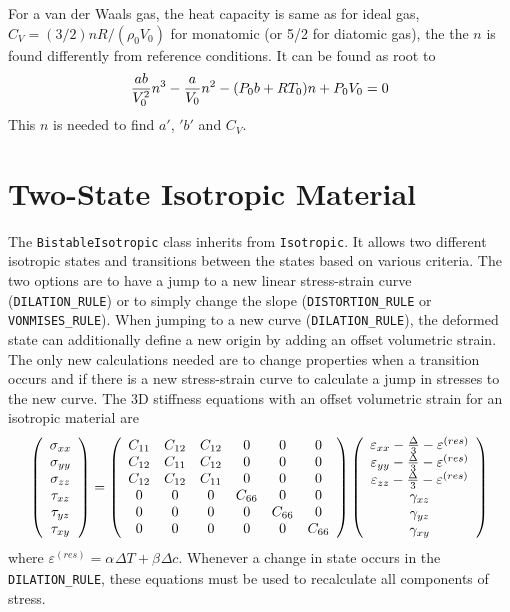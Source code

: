 \documentclass[11pt]{article}
\def\a#1{\alpha_{#1}}
\def\b#1{\beta_{#1}}
\def\code#1{{\small\tt #1}}
\def\DT{\Delta T}
\def\e#1{\varepsilon_{#1}}
\def\er#1{\varepsilon_{#1}^{(res)}}
\def\g#1{\gamma_{#1}}
\def\s#1{\sigma_{#1}}
\def\t#1{\tau_{#1}}
\begin{document}
For a van der Waals gas, the heat capacity is same as for ideal gas, $C_V=(3/2)nR/(\rho_0 V_0)$ for monatomic (or 5/2 for diatomic gas), the the $n$ is found differently from reference conditions. It can be found as root to
\begin{equation}
     {ab\over V_0^2} n^3 - {a\over V_0} n^2 - (P_0b+RT_0)n + P_0V_0 = 0
\end{equation}
This $n$ is needed to find $a'$, $'b'$ and $C_V$.


\section{Two-State Isotropic Material}

The \code{BistableIsotropic} class inherits from \code{Isotropic}. It allows two different isotropic states and transitions  between the states based on various criteria. The two options are to have a jump to a new linear stress-strain curve (\code{DILATION\_RULE}) or to simply change the slope (\code{DISTORTION\_RULE} or \code{VONMISES\_RULE}). When jumping to a new curve (\code{DILATION\_RULE}), the deformed state can additionally define a new origin by adding an offset volumetric strain. The only new calculations needed are to change properties when a transition occurs and if there is a new stress-strain curve to calculate a jump in stresses to the new curve. The 3D stiffness equations with an offset volumetric strain for an isotropic material are
\begin{equation}
     \left(\begin{array}{c} \s{xx} \\ \s{yy} \\ \s{zz} \\ \t{xz} \\ \t{yz} \\ \t{xy} \end{array}\right)
       =  \left(\begin{array}{cccccc}
      C_{11} & C_{12} & C_{12} & 0 & 0 & 0 \\
      C_{12} & C_{11} & C_{12} & 0 & 0 & 0 \\
      C_{12} & C_{12} & C_{11} & 0 & 0 & 0 \\
      0 & 0 & 0 & C_{66} & 0 & 0 \\
      0 & 0 & 0 & 0 & C_{66} & 0  \\
      0 & 0 & 0 & 0 & 0 &  C_{66}  \end{array}\right)
     \left(\begin{array}{c} \e{xx} - {\Delta\over 3} -\er{}\\ \e{yy} - {\Delta\over 3} -\er{}\\ 
                   \e{zz} - {\Delta\over 3} - \er{}\\ 
                   \g{xz} \\ \g{yz} \\ \g{xy} \end{array}\right)
\end{equation}
where $\er{}=\a{}\DT+\b{}\Delta c$.
Whenever a change in state occurs in the \code{DILATION\_RULE}, these equations must be used to recalculate all components of stress.
\end{document}

